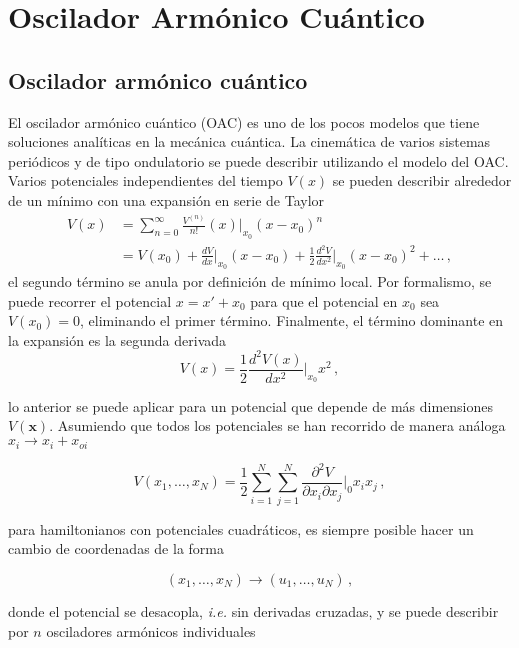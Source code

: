 \chapter{Oscilador Arm\'onico Cu\'antico}
\section{Oscilador armónico cuántico}

El oscilador armónico cuántico (OAC) es uno de los pocos modelos que tiene soluciones analíticas en la mecánica cuántica. La cinemática de varios sistemas periódicos y de tipo ondulatorio se puede describir utilizando el modelo del OAC.
Varios potenciales independientes del tiempo $V(x)$ se pueden describir alrededor de un mínimo con una expansión en serie de Taylor
\begin{align*}
V(x) & = \sum_{n=0}^{\infty} \frac{V^{(n)}}{n!} (x)|_{x_0} (x-x_0)^n \\ &= V(x_0) + \frac{dV}{dx}\Big|_{x_0} (x-x_0) + \frac{1}{2}\frac{d^2V}{dx^2}\Big|_{x_0} (x-x_0)^2 + \dots \,,
\end{align*}
el segundo término se anula por definición de mínimo local. Por formalismo, se puede recorrer el potencial $x = x' + x_0$ para que el potencial en $x_0$ sea $V(x_0) = 0$, eliminando el primer término. Finalmente, el término dominante en la expansión es la segunda derivada
\begin{equation}
\label{OA.1}
V(x) = \frac{1}{2}\frac{d^2V(x)}{dx^2}\Big|_{x_0}x^2 \,,
\end{equation}

lo anterior se puede aplicar para un potencial que depende de más dimensiones $V(\mathbf{x})$. Asumiendo que todos los potenciales se han recorrido de manera análoga $x_i \to x_i + x_{oi}$

\begin{equation*}
  V(x_1, \dots, x_N) = \frac{1}{2}\sum_{i=1}^N \sum_{j=1}^N \frac{\partial^2 V}{\partial x_i \partial x_j}\Big|_{0} x_i x_j \,,
\end{equation*}

para hamiltonianos con potenciales cuadráticos, es siempre posible hacer un cambio de coordenadas de la forma

\begin{equation*}
  (x_{1}, \dots, x_N) \to (u_1, \dots, u_N)\,,
\end{equation*}

donde el potencial se desacopla, \textit{i.e.} sin derivadas cruzadas, y se puede describir por $n$ osciladores armónicos individuales

